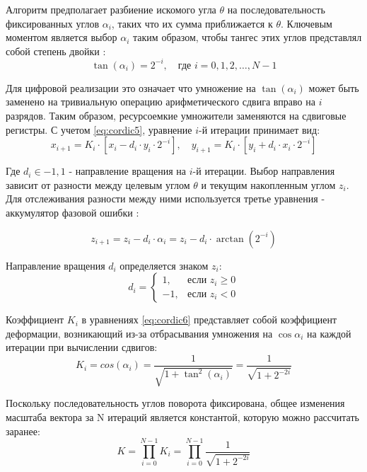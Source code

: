 \documentclass[12pt,a4paper,TimesNewRoman]{article}
\begin{document}
Алгоритм предполагает разбиение искомого угла $\theta$ на последовательность фиксированных углов $\alpha_i$, таких что их сумма приближается к $\theta$. Ключевым моментом является выбор $\alpha_i$ таким образом, чтобы тангес этих углов представлял собой степень двойки \cite{cordic}:
\begin{equation} \label{eq:cordic5}
    \tan(\alpha_i) = 2^{-i}, \quad \text{где } i=0,1,2, \dots, N-1
\end{equation}

Для цифровой реализации это означает что умножение на $\tan(\alpha_i)$ может быть заменено на тривиальную операцию арифметического сдвига вправо на $i$ разрядов. Таким образом, ресурсоемкие умножители заменяются на сдвиговые регистры. С учетом \eqref{eq:cordic5}, уравнение $i$-й итерации принимает вид:
\begin{equation} \label{eq:cordic6}
    x_{i+1} = K_i \cdot \left[x_i - d_i \cdot y_i \cdot 2^{-i}\right], \quad
    y_{i+1} = K_i \cdot \left[y_i + d_i \cdot x_i \cdot 2^{-i}\right]
\end{equation}

Где $d_i \in {-1,1}$ - направление вращения на $i$-й итерации. Выбор направления зависит от разности между целевым углом $\theta$ и текущим накопленным углом $z_i$. Для отслеживания разности между ними используется третье уравнения - аккумулятор фазовой ошибки \cite{cordic}:

\begin{equation} \label{eq:cordic7}
    z_{i+1} = z_i - d_i \cdot \alpha_i = z_i - d_i \cdot \arctan(2^{-i})
\end{equation}

Направление вращения $d_i$ определяется знаком $z_i$:
\begin{equation}
    d_i =
    \begin{cases}
        1, & \text{если } z_i \ge 0 \\
        -1, & \text{если } z_i < 0
    \end{cases}
\end{equation}

Коэффициент $K_i$ в уравнениях \eqref{eq:cordic6} представляет собой коэффициент деформации, возникающий из-за отбрасывания умножения на $\cos\alpha_i$ на каждой итерации при вычислении сдвигов:
\begin{equation}
    K_i = cos(\alpha_i) = \frac{1}{\sqrt{1 + \tan^2(\alpha_i)}} = \frac{1}{\sqrt{1 + 2^{-2i}}}
\end{equation} 

Поскольку последовательность углов поворота фиксирована, общее изменения масштаба вектора за N итераций является константой, которую можно рассчитать заранее:
\begin{equation}
    K = \prod_{i=0}^{N-1} K_i = \prod_{i=0}^{N-1} \frac{1}{\sqrt{1 + 2^{-2i}}}
\end{equation}
\end{document}
